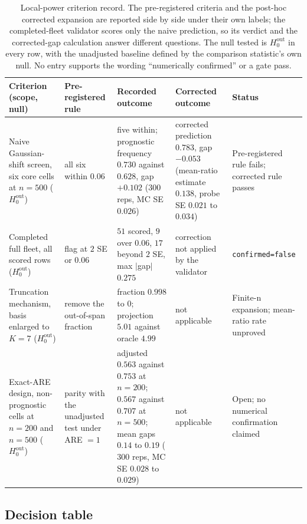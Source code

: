 \clearpage
\begin{table}[H]
\centering
\small
\setlength{\tabcolsep}{3pt}
\begin{tabular}{>{\raggedright\arraybackslash}p{3.1cm}>{\raggedright\arraybackslash}p{2.7cm}>{\raggedright\arraybackslash}p{4.0cm}>{\raggedright\arraybackslash}p{2.9cm}>{\raggedright\arraybackslash}p{1.9cm}}
\toprule
Criterion (scope, null) & Pre-registered rule & Recorded outcome & Corrected outcome & Status \\
\midrule
Naive Gaussian-shift screen, six core cells at $n=500$ ($H_0^{\mathrm{out}}$) & all six within $0.06$ & five within; prognostic frequency $0.730$ against $0.628$, gap $+0.102$ ($300$ reps, MC SE $0.026$) & corrected prediction $0.783$, gap $-0.053$ (mean-ratio estimate $0.138$, probe SE $0.021$ to $0.034$) & Pre-registered rule fails; corrected rule passes \\
Completed full fleet, all scored rows ($H_0^{\mathrm{out}}$) & flag at $2$ SE or $0.06$ & $51$ scored, $9$ over $0.06$, $17$ beyond $2$ SE, max $|$gap$|$ $0.275$ & correction not applied by the validator & \texttt{confirmed=}\allowbreak\texttt{false} \\
Truncation mechanism, basis enlarged to $K=7$ ($H_0^{\mathrm{out}}$) & remove the out-of-span fraction & fraction $0.998$ to $0$; projection $5.01$ against oracle $4.99$ & not applicable & Finite-n expansion; mean-ratio rate unproved \\
Exact-ARE design, non-prognostic cells at $n=200$ and $n=500$ ($H_0^{\mathrm{out}}$) & parity with the unadjusted test under ARE $=1$ & adjusted $0.563$ against $0.753$ at $n=200$; $0.567$ against $0.707$ at $n=500$; mean gaps $0.14$ to $0.19$ ($300$ reps, MC SE $0.028$ to $0.029$) & not applicable & Open; no numerical confirmation claimed \\
\bottomrule
\end{tabular}
\caption{Local-power criterion record. The pre-registered criteria and the post-hoc corrected expansion are reported side by side under their own labels; the completed-fleet validator scores only the naive prediction, so its verdict and the corrected-gap calculation answer different questions. The null tested is $H_0^{\mathrm{out}}$ in every row, with the unadjusted baseline defined by the comparison statistic's own null. No entry supports the wording ``numerically confirmed'' or a gate pass.}
\label{tab:localpower}
\end{table}

\subsection{Decision table}
\label{sec:exp:decision}

